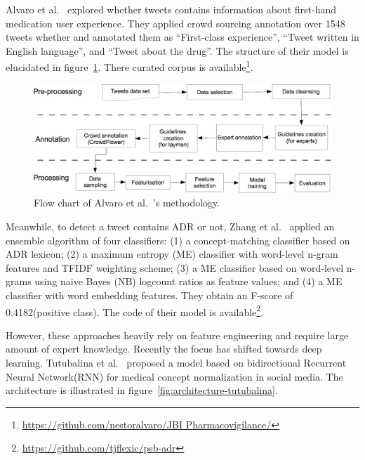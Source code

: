 Alvaro et al.~\cite{alvaro2015crowdsourcing} explored whether tweets contains information about first-hand medication user experience. They applied crowd sourcing annotation over 1548 tweets whether and annotated them as “First-class experience”, “Tweet written in English language”, and “Tweet about the drug”. The structure of their model is elucidated in figure~\ref{fig:flowchart-alvaro}. There curated corpus is available\footnote{\url{https://github.com/nestoralvaro/JBI Pharmacovigilance/}}.

\begin{figure}[h]
	\centering
	\includegraphics[width=0.99\linewidth]{Figures/n.jpg}
	\caption{Flow chart of Alvaro et al.~\cite{alvaro2015crowdsourcing}’s methodology.}
	\label{fig:flowchart-alvaro}
\end{figure}


Meanwhile, to detect a tweet contains ADR or not, Zhang et al.~\cite{zhang2016ensemble} applied an ensemble algorithm of four classifiers: (1) a concept-matching classifier based on ADR lexicon; (2) a maximum entropy (ME) classifier with word-level n-gram features and TFIDF weighting scheme; (3) a ME classifier based on word-level n-grams using naive Bayes (NB) logcount ratios as feature values; and (4) a ME classifier with word embedding features. They obtain an F-score of 0.4182(positive class). The code of their model is available\footnote{\url{https://github.com/tjflexic/psb-adr}}.


However, these approaches heavily rely on feature engineering and require large amount of expert knowledge. Recently the focus has shifted towards deep learning. Tutubalina et al.~\cite{TUTUBALINA201893} proposed a model based on bidirectional Recurrent Neural Network(RNN) for medical concept normalization in social media. The architecture is illustrated in figure~\ref{fig:architecture-tutubalina}.


